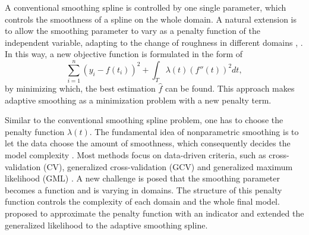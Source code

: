 



A conventional smoothing spline is controlled by one single parameter, which controls the smoothness of a spline on the whole domain. A natural extension is to allow the smoothing parameter to vary as a penalty function of the independent variable, adapting to the change of roughness in different domains \cite{silverman1985some}, \cite{donoho1995wavelet}. In this way, a new objective function is formulated in the form of 
\begin{equation}\label{objective}
\sum_{i=1}^{n}\left(y_i-f(t_i) \right)^2+\int_T\lambda(t) \left( f''(t)\right)^2 dt,
\end{equation}
by minimizing which, the best estimation $\hat{f}$ can be found. This approach makes adaptive smoothing as a minimization problem with a new penalty term. 


Similar to the conventional smoothing spline problem, one has to choose the penalty function $\lambda(t)$. The fundamental idea of nonparametric smoothing is to let the data choose the amount of smoothness, which consequently decides the model complexity \cite{gu1998model}. Most methods focus on data-driven criteria, such as cross-validation (CV), generalized cross-validation (GCV) \cite{craven1978smoothing} and generalized maximum likelihood (GML) \cite{wahba1985comparison}. A new challenge is posed that the smoothing parameter becomes a function and is varying in domains. The structure of this penalty function controls the complexity of each domain and the whole final model. \cite{liu2010data} proposed to approximate the penalty function with an indicator and extended the generalized likelihood to the adaptive smoothing spline.


